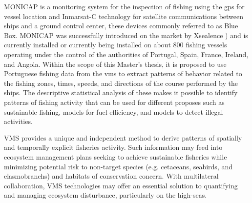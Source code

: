 MONICAP \cite{WEBSITE:MonicapXsealence} is a monitoring system for the inspection of fishing using the \gls{gps} for vessel location and Inmarsat-C \cite{WEBSITE:inmarsatC} technology for satellite communications between ships and a ground control center, these devices commonly referred to as Blue Box. MONICAP was successfully introduced on the market by Xsealence \cite{WEBSITE:Xsealence}) and is currently installed or currently being installed on about 800 fishing vessels operating under the control of the authorities of Portugal, Spain, France, Ireland, and Angola. Within the scope of this Master's thesis, it is proposed to use Portuguese fishing data from the \gls{vms} to extract patterns of behavior related to the fishing zones, times, speeds, and directions of the course performed by the ships. The descriptive statistical analysis of these makes it possible to identify patterns of fishing activity that can be used for different proposes such as sustainable fishing, models for fuel efficiency, and  models to detect illegal activities.

VMS provides a unique and independent method to derive patterns of spatially and temporally explicit fisheries activity. Such information may feed into ecosystem management plans seeking to achieve sustainable fisheries while minimizing potential risk to non-target species (e.g. cetaceans, seabirds, and elasmobranchs) and habitats of conservation concern. With multilateral collaboration, VMS technologies may offer an essential solution to quantifying and managing ecosystem disturbance, particularly on the high-seas.




%
%
%


